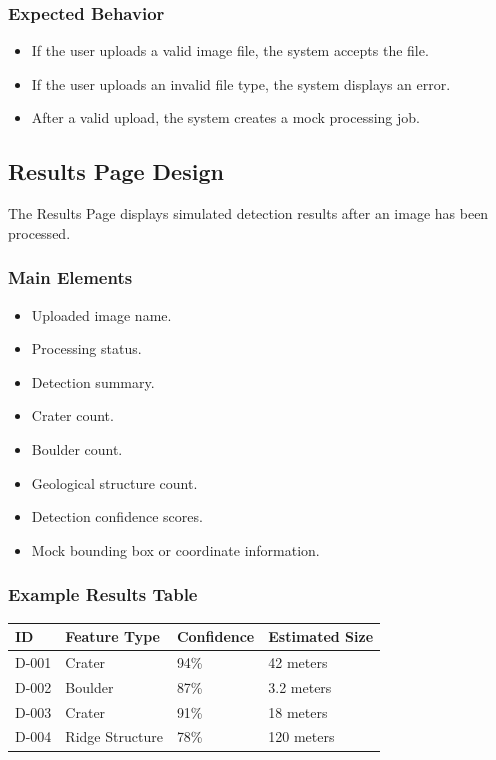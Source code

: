 \documentclass[12pt]{article}
\begin{document}
\subsubsection{Expected Behavior}

\begin{itemize}
    \item If the user uploads a valid image file, the system accepts the file.
    \item If the user uploads an invalid file type, the system displays an error.
    \item After a valid upload, the system creates a mock processing job.
\end{itemize}

\subsection{Results Page Design}

The Results Page displays simulated detection results after an image has been processed.

\subsubsection{Main Elements}

\begin{itemize}
    \item Uploaded image name.
    \item Processing status.
    \item Detection summary.
    \item Crater count.
    \item Boulder count.
    \item Geological structure count.
    \item Detection confidence scores.
    \item Mock bounding box or coordinate information.
\end{itemize}

\subsubsection{Example Results Table}

\begin{longtable}{|p{1in}|p{1.5in}|p{1.5in}|p{1.5in}|}
\hline
\textbf{ID} & \textbf{Feature Type} & \textbf{Confidence} & \textbf{Estimated Size} \\
\hline
D-001 & Crater & 94\% & 42 meters \\
\hline
D-002 & Boulder & 87\% & 3.2 meters \\
\hline
D-003 & Crater & 91\% & 18 meters \\
\hline
D-004 & Ridge Structure & 78\% & 120 meters \\
\hline
\end{longtable}
\end{document}
